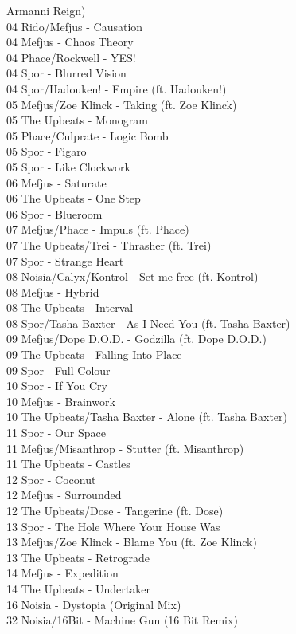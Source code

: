 \begin{multicols}{2}
Armanni Reign)\\ 04 Rido/Mefjus - Causation\\ 04 Mefjus - Chaos Theory\\ 04 Phace/Rockwell - YES!\\ 04 Spor - Blurred Vision\\ 04 Spor/Hadouken! - Empire (ft. Hadouken!)\\ 05 Mefjus/Zoe Klinck - Taking (ft. Zoe Klinck)\\ 05 The Upbeats - Monogram\\ 05 Phace/Culprate - Logic Bomb\\ 05 Spor - Figaro\\ 05 Spor - Like Clockwork\\ 06 Mefjus - Saturate\\ 06 The Upbeats - One Step\\ 06 Spor - Blueroom\\ 07 Mefjus/Phace - Impuls (ft. Phace)\\ 07 The Upbeats/Trei - Thrasher (ft. Trei)\\ 07 Spor - Strange Heart\\ 08 Noisia/Calyx/Kontrol - Set me free (ft. Kontrol)\\ 08 Mefjus - Hybrid\\ 08 The Upbeats - Interval\\ 08 Spor/Tasha Baxter - As I Need You (ft. Tasha Baxter)\\ 09 Mefjus/Dope D.O.D. - Godzilla (ft. Dope D.O.D.)\\ 09 The Upbeats - Falling Into Place\\ 09 Spor - Full Colour\\ 10 Spor - If You Cry\\ 10 Mefjus - Brainwork\\ 10 The Upbeats/Tasha Baxter - Alone (ft. Tasha Baxter)\\ 11 Spor - Our Space\\ 11 Mefjus/Misanthrop - Stutter (ft. Misanthrop)\\ 11 The Upbeats - Castles\\ 12 Spor - Coconut\\ 12 Mefjus - Surrounded\\ 12 The Upbeats/Dose - Tangerine (ft. Dose)\\ 13 Spor - The Hole Where Your House Was\\ 13 Mefjus/Zoe Klinck - Blame You (ft. Zoe Klinck)\\ 13 The Upbeats - Retrograde\\ 14 Mefjus - Expedition\\ 14 The Upbeats - Undertaker\\ 16 Noisia - Dystopia (Original Mix)\\ 32 Noisia/16Bit - Machine Gun (16 Bit Remix)\\

\end{multicols}
